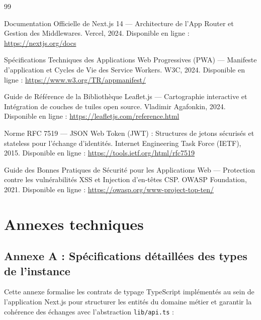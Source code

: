 \documentclass[12pt,a4paper]{report}
\begin{document}
\begin{thebibliography}{99}

Documentation Officielle de Next.js 14 --- Architecture de l'App Router et Gestion des Middlewares. Vercel, 2024. Disponible en ligne : \url{https://nextjs.org/docs}

Spécifications Techniques des Applications Web Progressives (PWA) --- Manifeste d'application et Cycles de Vie des Service Workers. W3C, 2024. Disponible en ligne : \url{https://www.w3.org/TR/appmanifest/}

Guide de Référence de la Bibliothèque Leaflet.js --- Cartographie interactive et Intégration de couches de tuiles open source. Vladimir Agafonkin, 2024. Disponible en ligne : \url{https://leafletjs.com/reference.html}

Norme RFC 7519 --- JSON Web Token (JWT) : Structures de jetons sécurisés et stateless pour l'échange d'identités. Internet Engineering Task Force (IETF), 2015. Disponible en ligne : \url{https://tools.ietf.org/html/rfc7519}

Guide des Bonnes Pratiques de Sécurité pour les Applications Web --- Protection contre les vulnérabilités XSS et Injection d'en-têtes CSP. OWASP Foundation, 2021. Disponible en ligne : \url{https://owasp.org/www-project-top-ten/}

\end{thebibliography}

\appendix

\section{Annexes techniques}

\subsection{Annexe A : Spécifications détaillées des types de l'instance}

Cette annexe formalise les contrats de typage TypeScript implémentés au sein de l'application Next.js pour structurer les entités du domaine métier et garantir la cohérence des échanges avec l'abstraction \texttt{lib/api.ts} :
\end{document}
